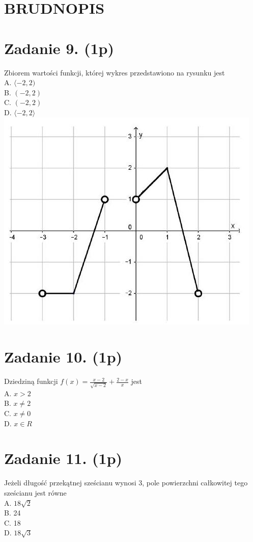 \documentclass[10pt]{article}
\begin{document}
\section*{BRUDNOPIS}
\section*{Zadanie 9. (1p)}
Zbiorem wartości funkcji, której wykres przedstawiono na rysunku jest\\
A. \(\langle-2,2)\)\\
B. \((-2,2)\)\\
C. \((-2,2)\)\\
D. \(\langle-2,2\rangle\)\\
\includegraphics[max width=\textwidth, center]{2024_11_21_0213a2175f3206eefc55g-04}

\section*{Zadanie 10. (1p)}
Dziedziną funkcji \(f(x)=\frac{x-2}{\sqrt{x-2}}+\frac{2-x}{x}\) jest\\
A. \(x>2\)\\
B. \(x \neq 2\)\\
C. \(x \neq 0\)\\
D. \(x \in R\)

\section*{Zadanie 11. (1p)}
Jeżeli długość przekątnej sześcianu wynosi 3, pole powierzchni całkowitej tego sześcianu jest równe\\
A. \(18 \sqrt{2}\)\\
B. 24\\
C. 18\\
D. \(18 \sqrt{3}\)
\end{document}
